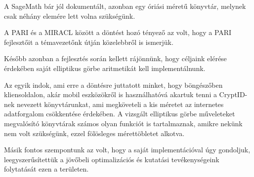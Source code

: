A SageMath bár jól dokumentált, azonban egy óriási méretű könyvtár, melynek csak néhány elemére lett volna szükségünk. 

A PARI \cite{PARI} és a MIRACL között a döntést hozó tényező az volt, hogy a PARI fejlesztőit a témavezetőnk útján közelebbről is ismerjük.

Később azonban a fejlesztés során kellett rájönnünk, hogy céljaink elérése érdekében saját elliptikus görbe aritmetikát kell implementálnunk. 

Az egyik indok, ami erre a döntésre juttatott minket, hogy böngészőben kliensoldalon, akár mobil eszközökről is használhatóvá akartuk tenni a CryptID-nek nevezett könyvtárunkat, ami megköveteli a kis méretet az internetes adatforgalom csökkentése érdekében. A vizsgált elliptikus görbe műveleteket megvalósító könyvtárak számos olyan funkciót is tartalmaznak, amikre nekünk nem volt szükségünk, ezzel fölösleges mérettöbletet alkotva.

Másik fontos szempontunk az volt, hogy a saját implementációval úgy gondoljuk, leegyszerűsítettük a jövőbeli optimalizációs és kutatási tevékenységeink folytatását ezen a területen.

